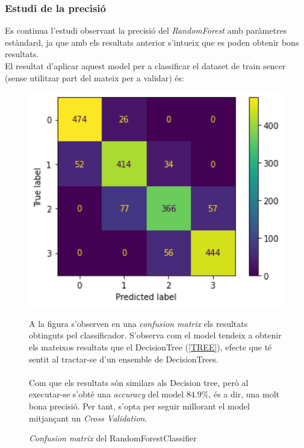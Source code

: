\documentclass[a4paper, 11pt]{article}
\begin{document}
\subsubsection{Estudi de la precisió}
Es continua l'estudi observant la precisió del \textit{RandomForest} amb paràmetres estàndard, ja que amb els resultats anterior s'intueix que es poden obtenir bons resultats.\\
El resultat d'aplicar aquest model per a classificar el dataset de train sencer (sense utilitzar part del mateix per a validar) és:
\begin{figure}[h] %
\begin{minipage}{7cm} %
\begin{center}
    \includegraphics[width=1\textwidth]{ConfMatrix/confusionmatrix_random.png}
    \caption{\textit{Confusion matrix} del RandomForestClassifier}
\end{center}
\end{minipage} %
\hspace{2em}
\begin{minipage}{7cm} %
A la figura s'observen en una \textit{confusion matrix} els resultats obtinguts pel classificador. S'observa com el model tendeix a obtenir els mateixos resultats que el DecisionTree (\textcolor{blue}{\ref{TREE}}), efecte que té sentit al tractar-se d'un ensemble de DecisionTrees.\\\\
Com que els resultats són similars als Decision tree, però al executar-se s'obté una \textit{accuracy} del model $84.9\%$, és a dir, una molt bona precisió. Per tant, s'opta per seguir millorant el model mitjançant un \textit{Cross Validation}.
\end{minipage} %
\end{figure} %
\end{document}
